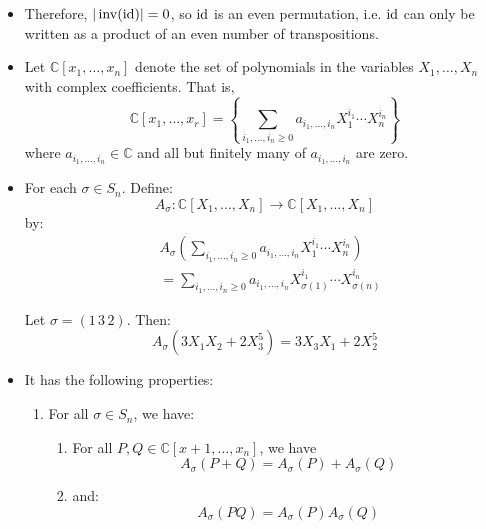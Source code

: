 \begin{itemize}
    \item Therefore, $|\operatorname{inv}(\text{id})|=0$, so $\text{id}$ is an even permutation, i.e. $\text{id}$ can only be written as a product of an even number of transpositions.
    \item Let $\mathbb{C}[x_1,\dots,x_n]$ denote the set of polynomials in the variables $X_1,\dots,X_n$ with complex coefficients. That is,
        \begin{equation}
            \mathbb{C}[x_1,\dots,x_r] = \left\{ \sum_{i_1,\dots,i_n \ge 0} a_{i_1,\dots, i_n} X_1^{i_1}\cdots X_n^{i_n}\right\}
        \end{equation}
        where $a_{i_1,\dots,i_n} \in \mathbb{C}$ and all but finitely many of $a_{i_1,\dots , i_n}$ are zero.
        \vspace{2mm}

    \item For each $\sigma \in S_n$. Define:
        \begin{equation}
            A_\sigma: \mathbb{C}[X_1,\dots,X_n] \rightarrow \mathbb{C} [X_1,\dots,X_n]
        \end{equation}
    by:
    \begin{align}
        & A_\sigma \left(\sum_{i_1,\dots,i_n \ge 0} a_{i_1,\dots,i_n} X_1^{i_1}\cdots X_n^{i_n}\right) \\ 
        &= \sum_{i_1,\dots, i_n \ge 0} a_{i_1,\dots,i_n} X_{\sigma(1)}^{i_1} \cdots  X_{\sigma(n)}^{i_n} 
    \end{align}
    \begin{example}
        Let $\sigma = (1\,3\,2)$. Then:
        \begin{equation}
            A_\sigma (3X_1X_2 + 2X_3^5) = 3X_3X_1 + 2X_2^5
        \end{equation}
    \end{example}
    \item It has the following properties:
    \begin{enumerate}
        \item For all $\sigma \in S_n$, we have:
        \begin{enumerate}
            \item For all $P,Q \in \mathbb{C}[x+1,\dots, x_n]$, we have 
            $$A_\sigma(P+Q) = A_\sigma(P) + A_\sigma(Q)$$
            \item and:
            \begin{equation}
                A_\sigma(PQ) = A_\sigma(P)A_\sigma(Q)
            \end{equation}
        \end{enumerate}


\end{enumerate}
\end{itemize}
